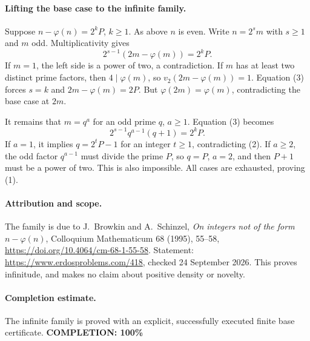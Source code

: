 \paragraph{Lifting the base case to the infinite family.}
Suppose \(n-\varphi(n)=2^kP\), \(k\geq1\). As above \(n\) is even.
Write \(n=2^s m\) with \(s\geq1\) and \(m\) odd. Multiplicativity gives
\[
 2^{s-1}(2m-\varphi(m))=2^kP.
 \tag{3}
\]
If \(m=1\), the left side is a power of two, a contradiction.
If \(m\) has at least two distinct prime factors, then
\(4\mid\varphi(m)\), so \(v_2(2m-\varphi(m))=1\).
Equation (3) forces \(s=k\) and \(2m-\varphi(m)=2P\).
But \(\varphi(2m)=\varphi(m)\), contradicting the base case at \(2m\).

It remains that \(m=q^a\) for an odd prime \(q\), \(a\geq1\).
Equation (3) becomes
\[
 2^{s-1}q^{a-1}(q+1)=2^kP.
\]
If \(a=1\), it implies \(q=2^tP-1\) for an integer \(t\geq1\),
contradicting (2). If \(a\geq2\), the odd factor \(q^{a-1}\)
must divide the prime \(P\), so \(q=P\), \(a=2\), and then \(P+1\)
must be a power of two. This is also impossible. All cases are exhausted,
proving (1).

\paragraph{Attribution and scope.}
The family is due to J.~Browkin and A.~Schinzel,
\emph{On integers not of the form \(n-\varphi(n)\)},
Colloquium Mathematicum 68 (1995), 55--58,
\url{https://doi.org/10.4064/cm-68-1-55-58}.
Statement: \url{https://www.erdosproblems.com/418},
checked 24 September 2026. This proves infinitude, and makes no claim
about positive density or novelty.

\paragraph{Completion estimate.}
The infinite family is proved with an explicit, successfully executed finite base certificate.
\textbf{COMPLETION: 100\%}
